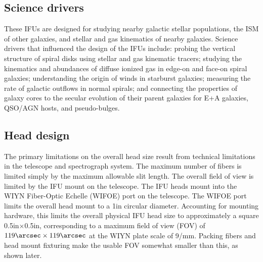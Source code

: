 \subsection{Science drivers} 
\label{GPBsub:sec:scidri}
These IFUs are designed for studying nearby galactic stellar populations, the
ISM of other galaxies, and stellar and gas kinematics of nearby galaxies.
Science drivers that influenced the design of the IFUs include: probing the
vertical structure of spiral disks using stellar and gas kinematic tracers;
studying the kinematics and abundances of diffuse ionized gas in edge-on and
face-on spiral galaxies; understanding the origin of winds in starburst
galaxies; measuring the rate of galactic outflows in normal spirals; and
connecting the properties of galaxy cores to the secular evolution of their
parent galaxies for E+A galaxies, QSO/AGN hosts, and pseudo-bulges.



\subsection{Head design} 
\label{GPBsub:sec:heads}
The primary limitations on the overall head size result from technical
limitations in the telescope and spectrograph system.  The maximum number of
fibers is limited simply by the maximum allowable slit length.  The overall
field of view is limited by the IFU mount on the telescope.  The IFU heads
mount into the WIYN Fiber-Optic Echelle (WIFOE) port on the telescope.  The
WIFOE port limits the overall head mount to a 1in circular diameter.
Accounting for mounting hardware, this limits the overall physical IFU head
size to approximately a square 0.5in$\times$0.5in, corresponding to a maximum
field of view (FOV) of $119\arcsec\times119\arcsec$ at the WIYN plate scale of
9/mm.  Packing fibers and head mount fixturing make the usable FOV
somewhat smaller than this, as shown later.


